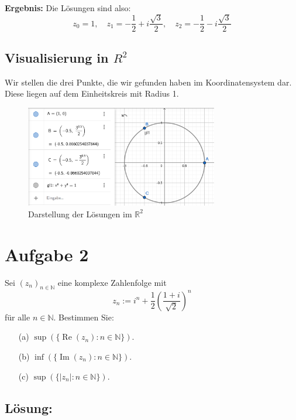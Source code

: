 \documentclass[11pt]{article}
\begin{document}
\textbf{Ergebnis:} Die Lösungen sind also:
\[
z_0 = 1, \quad z_1 = -\frac{1}{2} + i\frac{\sqrt{3}}{2}, \quad z_2 = -\frac{1}{2} - i\frac{\sqrt{3}}{2}
\]

\clearpage

\subsection*{Visualisierung in \(R^2\)}

Wir stellen die drei Punkte, die wir gefunden haben im Koordinatensystem dar. Diese liegen auf dem Einheitskreis
mit Radius 1.

\begin{figure}[h]
    \centering
    \includegraphics[width=0.75\textwidth]{img/a1_4_1.png}
    \caption{Darstellung der Lösungen im \(\mathbb{R}^2\)}
\end{figure}

\section*{Aufgabe 2}

Sei \( (z_n)_{n \in \mathbb{N}} \) eine komplexe Zahlenfolge mit
\[
z_n := i^n + \frac{1}{2} \left( \frac{1 + i}{\sqrt{2}} \right)^n
\]
für alle \( n \in \mathbb{N} \). Bestimmen Sie:

\begin{enumerate}
    \item[(a)] \( \sup(\{\operatorname{Re}(z_n) : n \in \mathbb{N}\}) \).
    \item[(b)] \( \inf(\{\operatorname{Im}(z_n) : n \in \mathbb{N}\}) \).
    \item[(c)] \( \sup(\{|z_n| : n \in \mathbb{N}\}) \).
\end{enumerate}

\subsection*{Lösung:}
\end{document}
